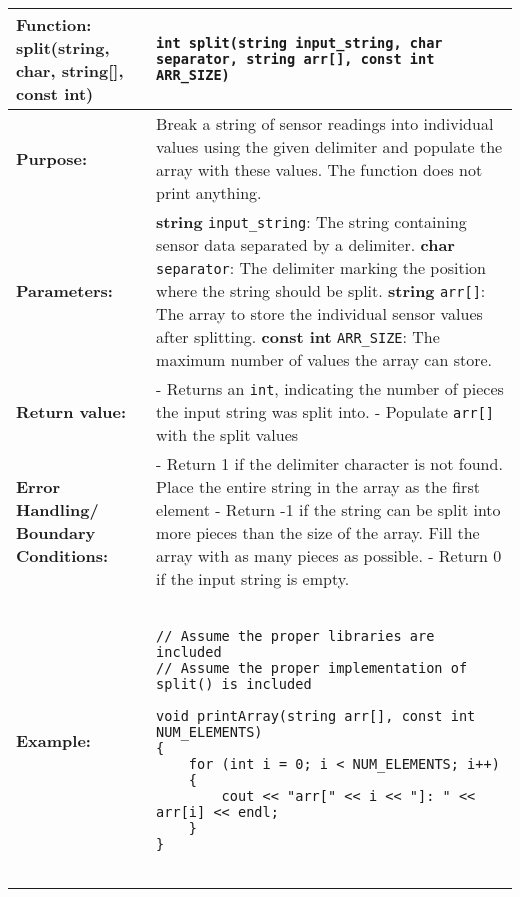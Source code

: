 \newpage
\begin{longtable}[H]{|p{1.7in}|p{4.0in}|} \hline
        \textbf{Function:} \newline 
        split(string, char, string[], const int) & \texttt{int split(string input_string, char separator, string arr[], const int ARR_SIZE)}
        \\ \hline
        \textbf{Purpose:}  & Break a string of sensor readings into individual values using the given delimiter and populate the array with these values. The function does not print anything.\\ \hline
        \textbf{Parameters:} &  
        \textbf{string} \texttt{input\_string}: The string containing sensor data separated by a delimiter. \newline
        \textbf{char} \texttt{separator}: The delimiter marking the position where the string should be split.\newline
        \textbf{string} \texttt{arr[]}: The array to store the individual sensor values after splitting.\newline
        \textbf{const int} \texttt{ARR\_SIZE}: The maximum number of values the array can store.
\\ \hline
        \textbf{Return value:} &  
        - Returns an \texttt{int}, indicating the number of pieces the input string was split into.
        \newline
        - Populate \texttt{arr[]} with the split values
\\ \hline
        \textbf{Error Handling/ Boundary Conditions:} & - Return 1 if the delimiter character is not found. Place the entire string in the array as the first element
        \newline
        - Return -1 if the string can be split into more pieces than the size of the array. Fill the array with as many pieces as possible. \newline
        - Return 0 if the input string is empty.
        \\ \hline
        \textbf{Example:} & 
               
        \begin{example} 
        \begin{verbatim}

// Assume the proper libraries are included
// Assume the proper implementation of split() is included

void printArray(string arr[], const int NUM_ELEMENTS)
{
    for (int i = 0; i < NUM_ELEMENTS; i++)
    {
        cout << "arr[" << i << "]: " << arr[i] << endl;
    }
}


\end{verbatim}
\end{example}
\end{longtable}
